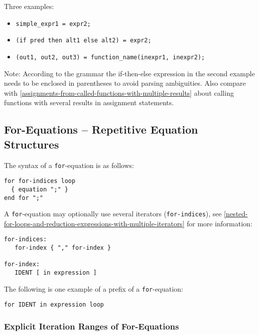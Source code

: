 Three examples:
\begin{itemize}
\item \lstinline!simple_expr1 = expr2;!
\item \lstinline!(if pred then alt1 else alt2) = expr2;!
\item \lstinline!(out1, out2, out3) = function_name(inexpr1, inexpr2);!
\end{itemize}

\begin{nonnormative}
Note: According to the grammar the if-then-else expression in the second example needs to be enclosed in parentheses to avoid parsing ambiguities.
Also compare with \cref{assignments-from-called-functions-with-multiple-results} about calling functions with several results in assignment statements.
\end{nonnormative}

\subsection{For-Equations -- Repetitive Equation Structures}\label{for-equations-repetitive-equation-structures}

The syntax of a \lstinline!for!-equation is as follows:
\begin{lstlisting}[language=grammar]
for for-indices loop
  { equation ";" }
end for ";"
\end{lstlisting}

A \lstinline!for!-equation may optionally use several iterators (\lstinline[language=grammar]!for-indices!), see \cref{nested-for-loops-and-reduction-expressions-with-multiple-iterators} for more information:
\begin{lstlisting}[language=grammar]
for-indices:
   for-index { "," for-index }

for-index:
   IDENT [ in expression ]
\end{lstlisting}

The following is one example of a prefix of a \lstinline!for!-equation:
\begin{lstlisting}[language=grammar]
for IDENT in expression loop
\end{lstlisting}

\subsubsection{Explicit Iteration Ranges of For-Equations}\label{explicit-iteration-ranges-of-for-equations}

